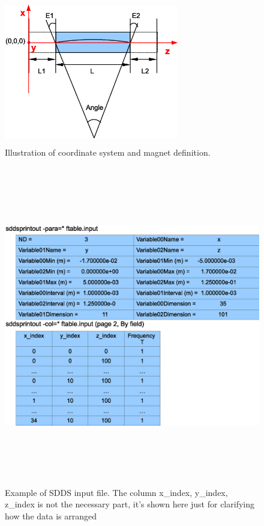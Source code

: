 \begin{figure}[htbp] 
  \begin{center}
  \includegraphics[width=3in,height=2.5in]{ftable-fig1.eps}
  \caption{\label{fig:ftable_mag} Illustration of coordinate
      system and magnet definition.}  
   \end{center} 
\end{figure}

\begin{figure}[htbp] 
  \begin{center}
  \includegraphics[width=6.5in,height=5.5in]{ftable-fig2.eps}
  \caption{\label{fig:ftable_input} Example of SDDS input
      file. The column x\_index, y\_index, z\_index is not the necessary
      part, it's shown here just for clarifying how the data is
      arranged} 
  \end{center} 
\end{figure}
